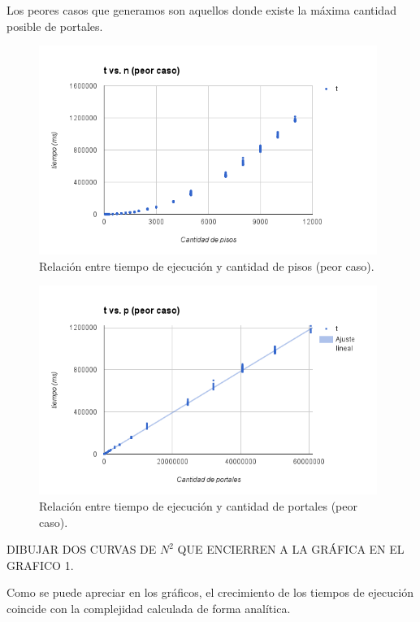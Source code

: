 Los peores casos que generamos son aquellos donde existe la máxima cantidad posible de portales.

 \begin{figure}[h!]
   \begin{center}
 	\includegraphics[width=11cm]{imagenes/ej1/tvsn-peorcaso.png}
	\caption{Relación entre tiempo de ejecución y cantidad de pisos (peor caso).}
	\label{tvsn-peorcaso}
   \end{center}
 \end{figure}
\begin{figure}[h!]
   \begin{center}
 	\includegraphics[width=11cm]{imagenes/ej1/tvsp-peorcaso.png}
	\caption{Relación entre tiempo de ejecución y cantidad de portales (peor caso).}
	\label{tvsp-peorcaso}
   \end{center}
 \end{figure}

 DIBUJAR DOS CURVAS DE $N^2$ QUE ENCIERREN A LA GRÁFICA EN EL GRAFICO 1.
 
 Como se puede apreciar en los gráficos, el crecimiento de los tiempos de ejecución coincide con la complejidad calculada de forma analítica.